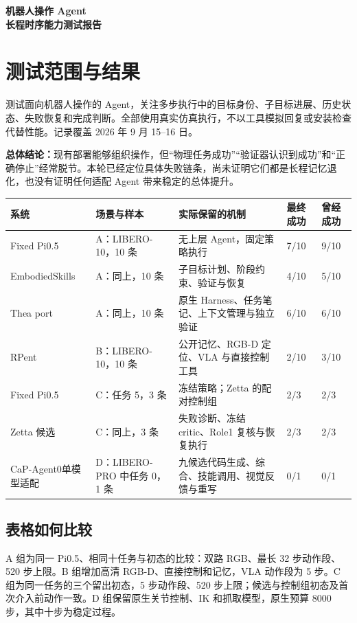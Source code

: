 \documentclass[UTF8,11pt,a4paper,fontset=none]{ctexart}
\begin{document}
\begin{titlepage}\thispagestyle{empty}\vspace*{0.32\textheight}
\begin{center}{\fontsize{27}{40}\selectfont\bfseries 机器人操作 Agent\\长程时序能力测试报告}\end{center}
\end{titlepage}
\setcounter{page}{1}

\section{测试范围与结果}
测试面向机器人操作的 Agent，关注多步执行中的目标身份、子目标进展、历史状态、失败恢复和完成判断。全部使用真实仿真执行，不以工具模拟回复或安装检查代替性能。记录覆盖 2026 年 9 月 15--16 日。

\textbf{总体结论：}现有部署能够组织操作，但“物理任务成功”“验证器认识到成功”和“正确停止”经常脱节。本轮已经定位具体失败链条，尚未证明它们都是长程记忆退化，也没有证明任何适配 Agent 带来稳定的总体提升。

\begin{tabular}{@{}L{28mm}L{32mm}L{53mm}L{17mm}L{17mm}@{}}\toprule
系统 & 场景与样本 & 实际保留的机制 & 最终成功 & 曾经成功\\\midrule
Fixed Pi0.5 & A：LIBERO-10，10 条 & 无上层 Agent，固定策略执行 & 7/10 & 9/10\\[4pt]
EmbodiedSkills & A：同上，10 条 & 子目标计划、阶段约束、验证与恢复 & 4/10 & 5/10\\[4pt]
Thea port & A：同上，10 条 & 原生 Harness、任务笔记、上下文管理与独立验证 & 6/10 & 6/10\\[4pt]
RPent & B：LIBERO-10，10 条 & 公开记忆、RGB-D 定位、VLA 与直接控制工具 & 2/10 & 3/10\\[4pt]
Fixed Pi0.5 & C：任务 5，3 条 & 冻结策略；Zetta 的配对控制组 & 2/3 & 2/3\\[4pt]
Zetta 候选 & C：同上，3 条 & 失败诊断、冻结 critic、Role1 复核与恢复执行 & 2/3 & 2/3\\[4pt]
CaP-Agent0\newline 单模型适配 & D：LIBERO-PRO 中任务 0，1 条 & 九候选代码生成、综合、技能调用、视觉反馈与重写 & 0/1 & 0/1\\\bottomrule
\end{tabular}

\subsection*{表格如何比较}
A 组为同一 Pi0.5、相同十任务与初态的比较：双路 RGB、最长 32 步动作段、520 步上限。B 组增加高清 RGB-D、直接控制和记忆，VLA 动作段为 5 步。C 组为同一任务的三个留出初态，5 步动作段、520 步上限；候选与控制组初态及首次介入前动作一致。D 组保留原生关节控制、IK 和抓取模型，原生预算 8000 步，其中十步为稳定过程。
\end{document}
